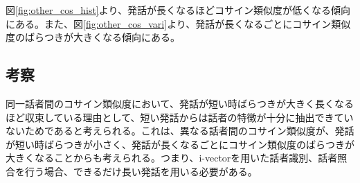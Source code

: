 図\ref{fig:other_cos_hist}より、発話が長くなるほどコサイン類似度が低くなる傾向にある。また、図\ref{fig:other_cos_vari}より、発話が長くなるごとにコサイン類似度のばらつきが大きくなる傾向にある。\par

\subsection{考察}
同一話者間のコサイン類似度において、発話が短い時ばらつきが大きく長くなるほど収束している理由として、短い発話からは話者の特徴が十分に抽出できていないためであると考えられる。これは、異なる話者間のコサイン類似度が、発話が短い時ばらつきが小さく、発話が長くなるごとにコサイン類似度のばらつきが大きくなることからも考えられる。つまり、i-vectorを用いた話者識別、話者照合を行う場合、できるだけ長い発話を用いる必要がある。
